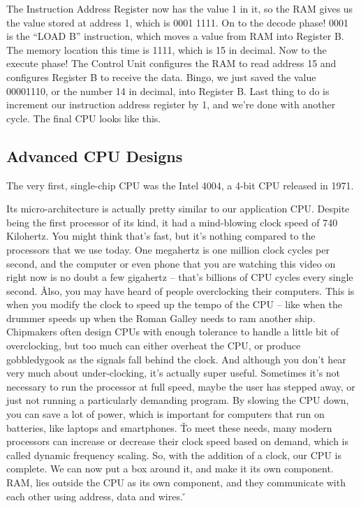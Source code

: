 The Instruction Address Register now has the value 1 in it, so the RAM gives us the value stored at address 1, which
is 0001 1111. On to the decode phase! 0001 is the ``LOAD B'' instruction, which moves a value from RAM into Register
B. The memory location this time is 1111, which is 15 in decimal. Now to the execute phase! The Control Unit
configures the RAM to read address 15 and configures Register B to receive the data. Bingo, we just saved the value
00001110, or the number 14 in decimal, into Register B. Last thing to do is increment our instruction address
register by 1, and we're done with another cycle. The final CPU looks like this.


\subsection{Advanced CPU Designs}

The very first, single-chip CPU was the Intel 4004, a 4-bit CPU released in 1971.


Its micro-architecture is actually pretty similar to our application CPU. Despite being the first processor of its
kind, it had a mind-blowing clock speed of 740 Kilohertz. You might think that's fast, but it's nothing compared to
the processors that we use today. One megahertz is one million clock cycles per second, and the computer or even
phone that you are watching this video on right now is no doubt a few gigahertz -- that's billions of CPU cycles
every single second. \v

Also, you may have heard of people overclocking their computers. This is when you modify the clock to speed up the
tempo of the CPU -- like when the drummer speeds up when the Roman Galley needs to ram another ship. Chipmakers
often design CPUs with enough tolerance to handle a little bit of overclocking, but too much can either overheat the
CPU, or produce gobbledygook as the signals fall behind the clock. And although you don't hear very much about
under-clocking, it's actually super useful. Sometimes it's not necessary to run the processor at full speed, maybe
the user has stepped away, or just not running a particularly demanding program. By slowing the CPU down, you can
save a lot of power, which is important for computers that run on batteries, like laptops and smartphones. \v

To meet these needs, many modern processors can increase or decrease their clock speed based on demand, which is
called dynamic frequency scaling. So, with the addition of a clock, our CPU is complete. We can now put a box around
it, and make it its own component. RAM, lies outside the CPU as its own component, and they communicate with each other
using address, data and wires. \v

